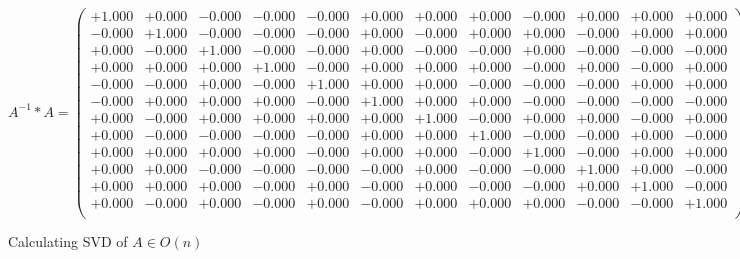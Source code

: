 \documentclass[9pt]{article}
\theoremstyle{plain}
\theoremstyle{definition}
\theoremstyle{remark}
\numberwithin{equation}{section}
\begin{document}
$A^{-1} *A = \left(
\begin{array}{
cccccccccccc}
+1.000 & +0.000 & -0.000 & -0.000 & -0.000 & +0.000 & +0.000 & +0.000 & -0.000 & +0.000 & +0.000 & +0.000 \\
-0.000 & +1.000 & -0.000 & -0.000 & -0.000 & +0.000 & -0.000 & +0.000 & +0.000 & -0.000 & +0.000 & +0.000 \\
+0.000 & -0.000 & +1.000 & -0.000 & -0.000 & +0.000 & -0.000 & -0.000 & +0.000 & -0.000 & -0.000 & -0.000 \\
+0.000 & +0.000 & +0.000 & +1.000 & -0.000 & +0.000 & +0.000 & +0.000 & -0.000 & +0.000 & -0.000 & +0.000 \\
-0.000 & -0.000 & +0.000 & -0.000 & +1.000 & +0.000 & +0.000 & -0.000 & -0.000 & -0.000 & +0.000 & +0.000 \\
-0.000 & +0.000 & +0.000 & +0.000 & -0.000 & +1.000 & +0.000 & +0.000 & -0.000 & -0.000 & -0.000 & -0.000 \\
+0.000 & -0.000 & +0.000 & +0.000 & +0.000 & +0.000 & +1.000 & -0.000 & +0.000 & +0.000 & -0.000 & +0.000 \\
+0.000 & -0.000 & -0.000 & -0.000 & -0.000 & +0.000 & +0.000 & +1.000 & -0.000 & -0.000 & +0.000 & -0.000 \\
+0.000 & +0.000 & +0.000 & +0.000 & -0.000 & +0.000 & +0.000 & -0.000 & +1.000 & -0.000 & +0.000 & +0.000 \\
+0.000 & +0.000 & -0.000 & -0.000 & -0.000 & -0.000 & +0.000 & -0.000 & -0.000 & +1.000 & +0.000 & -0.000 \\
+0.000 & +0.000 & +0.000 & -0.000 & +0.000 & -0.000 & +0.000 & -0.000 & -0.000 & +0.000 & +1.000 & -0.000 \\
+0.000 & -0.000 & +0.000 & -0.000 & +0.000 & -0.000 & +0.000 & +0.000 & +0.000 & -0.000 & -0.000 & +1.000 \\
\end{array}
\right)$ \newline 

Calculating SVD of  $A \in O(n)$
\end{document}
